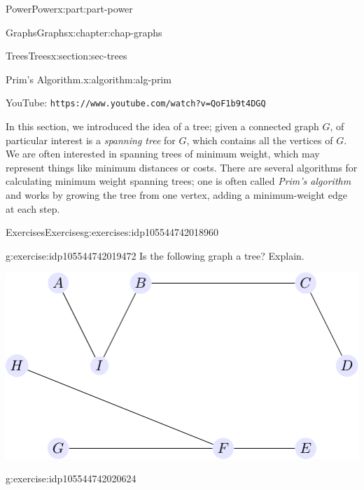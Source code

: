 \documentclass[oneside,10pt,]{book}
\newcommand{\mono}[1]{\texttt{#1}}
\numberwithin{equation}{section}
\newlength{\qrsize}
\begin{document}
\begin{partptx}{Power}{}{Power}{}{}{x:part:part-power}
\begin{chapterptx}{Graphs}{}{Graphs}{}{}{x:chapter:chap-graphs}
\begin{sectionptx}{Trees}{}{Trees}{}{}{x:section:sec-trees}
\begin{algorithm}{Prim's Algorithm.}{}{x:algorithm:alg-prim}
\begin{tcbraster}[raster columns=2, raster column skip=1pt, raster halign=center, raster force size=false, raster left skip=0pt, raster right skip=0pt]
\begin{tcolorbox}[qrstyle]%
{\hypersetup{urlcolor=black}}%
\end{tcolorbox}%
\begin{tcolorbox}[captionstyle]%
\small YouTube: \mono{https://www.youtube.com/watch?v=QoF1b9t4DGQ}\end{tcolorbox}%
\end{tcbraster}%
\end{algorithm}
\begin{conclusion}{}%
In this section, we introduced the idea of a tree; given a connected graph \(G\), of particular interest is a \emph{spanning tree} for \(G\), which contains all the vertices of \(G\). We are often interested in spanning trees of minimum weight, which may represent things like minimum distances or costs. There are several algorithms for calculating minimum weight spanning trees; one is often called \emph{Prim's algorithm} and works by growing the tree from one vertex, adding a minimum-weight edge at each step.%
\end{conclusion}%
%
%
\typeout{************************************************}
\typeout{************************************************}
%
\begin{exercises-subsection-numberless}{Exercises}{}{Exercises}{}{}{g:exercises:idp105544742018960}
\begin{divisionexercise}{1}{}{}{g:exercise:idp105544742019472}%
Is the following graph a tree? Explain.%
\begin{image}{0.3}{0.4}{0.3}%
\includegraphics[width=\linewidth]{./images/tree-exer01.pdf}
\end{image}%
\end{divisionexercise}%
\begin{divisionexercise}{2}{}{}{g:exercise:idp105544742020624}%

\end{divisionexercise}
\end{exercises-subsection-numberless}
\end{sectionptx}
\end{chapterptx}
\end{partptx}
\end{document}
